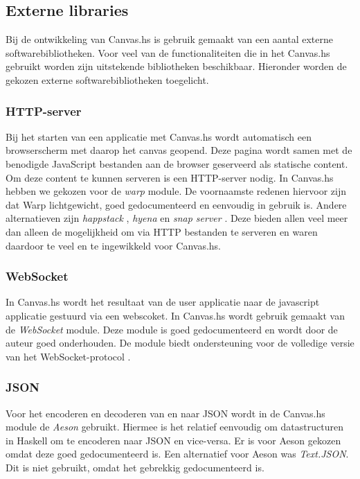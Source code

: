 \subsection{Externe libraries}
\label{subsec:externe_libraries}
Bij de ontwikkeling van Canvas.hs is gebruik gemaakt van een aantal externe softwarebibliotheken. Voor veel van de functionaliteiten die in het Canvas.hs gebruikt worden zijn uitstekende bibliotheken beschikbaar. Hieronder worden de gekozen externe softwarebibliotheken toegelicht.

\subsubsection{HTTP-server}
Bij het starten van een applicatie met Canvas.hs wordt automatisch een browserscherm met daarop het canvas geopend. Deze pagina wordt samen met de benodigde JavaScript bestanden aan de browser geserveerd als statische content. Om deze content te kunnen serveren is een HTTP-server nodig. In Canvas.hs hebben we gekozen voor de \emph{warp} \cite{Warp} module. De voornaamste redenen hiervoor zijn dat Warp lichtgewicht, goed gedocumenteerd en eenvoudig in gebruik is. Andere alternatieven zijn \emph{happstack} \cite{Happstack}, \emph{hyena} \cite{Hyena} en \emph{snap server} \cite{SnapServer}. Deze bieden allen veel meer dan alleen de mogelijkheid om via HTTP bestanden te serveren en waren daardoor te veel en te ingewikkeld voor Canvas.hs.

\subsubsection{WebSocket}
In Canvas.hs wordt het resultaat van de user applicatie naar de javascript applicatie gestuurd via een webscoket. In Canvas.hs wordt gebruik gemaakt van de \emph{WebSocket}  \cite{WebSocket} module. Deze module is goed gedocumenteerd en wordt door de auteur goed onderhouden. De module biedt ondersteuning voor de volledige versie van het WebSocket-protocol \cite{WebSocket2011}. 

\subsubsection{JSON}
Voor het encoderen en decoderen van en naar JSON wordt in de Canvas.hs module de \emph{Aeson} \cite{Aeson} gebruikt. Hiermee is het relatief eenvoudig om datastructuren in Haskell om te encoderen naar JSON en vice-versa. Er is voor Aeson gekozen omdat deze goed gedocumenteerd is. Een alternatief voor Aeson was \emph{Text.JSON}. Dit is niet gebruikt, omdat het gebrekkig gedocumenteerd is.

